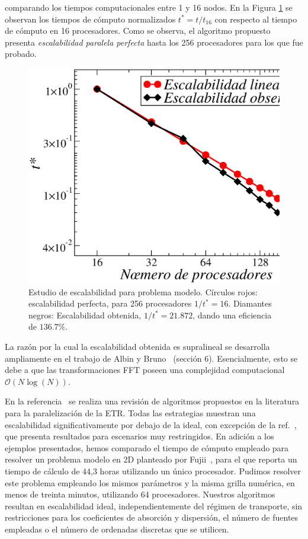 comparando los tiempos computacionales entre 1 y 16 nodos. 
En la Figura \ref{fig:scala} se observan los tiempos de cómputo 
normalizados $t^*=t/t_{16}$ con respecto al tiempo de cómputo 
en 16 procesadores. 
Como se observa, el algoritmo 
propuesto presenta \textit{escalabilidad paralela perfecta} 
hasta los 256 procesadores para los que fue probado. 
\begin{figure}[h!]
\centering
  \includegraphics[width=0.5\linewidth]{figuras/escalabilidad.eps}
  \caption{Estudio de escalabilidad para problema modelo. 
  Círculos rojos: escalabilidad perfecta, para 256 procesadores $1/t^*=16$. 
  Diamantes negros: Escalabilidad obtenida, $1/t^*=21.872$, dando 
 una eficiencia de $136.7\%$.}
 \label{fig:scala}
\end{figure}

La razón por la cual la escalabilidad obtenida es supralineal se 
desarrolla ampliamente en el trabajo de Albin y Bruno~\cite{Albin2011}
(sección 6). Esencialmente, esto se debe a que 
las transformaciones FFT 
poseen una complejidad computacional $\mathcal{O}(N\log(N))$.

En la 
referencia~\cite{Coelho2014} se realiza una revisión de algoritmos propuestos en la literatura 
para la paralelización de la ETR. Todas las estrategias muestran una escalabilidad significativamente por debajo de la ideal, con excepción de la ref.~\cite{Colomer2013}, 
que presenta resultados para escenarios muy restringidos. 
En adición a los ejemplos presentados, hemos comparado 
el tiempo de cómputo empleado para resolver 
un problema modelo en 2D planteado por Fujii~\cite [p. 153]{Fujii2014}, para el que reporta un tiempo de cálculo de 44,3 horas utilizando un único procesador. Pudimos resolver este problema empleando 
los mismos parámetros y la misma grilla numérica, 
en menos de treinta minutos, utilizando 64 procesadores.
Nuestros algoritmos resultan en escalabilidad ideal, independientemente 
del régimen de transporte, sin restricciones 
para los coeficientes de absorción y dispersión, el número de fuentes empleadas o el número de ordenadas discretas que se  utilicen.



